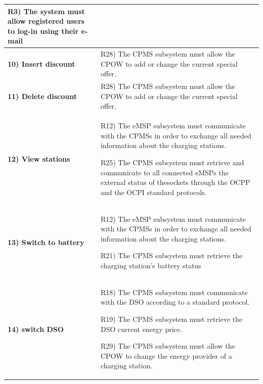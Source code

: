 \documentclass[table, 12pt]{article} %
\begin{document}
\begin{itemize}
\begin{longtable}{|p{}|p{}|}
                    R3) The system must allow registered users to log-in using their e-mail
                    \\\hline

                    \cellcolor{SpringGreen!50}\textbf{10) Insert discount}\centering & 
                    R28) The CPMS subsystem must allow the CPOW to add or change the current special offer.
                    \\\hline

                    \cellcolor{SpringGreen!50}\textbf{11) Delete discount}\centering & 
                    R28) The CPMS subsystem must allow the CPOW to add or change the current special offer.
                    \\\hline

                    \cellcolor{SpringGreen!50}\textbf{12) View stations}\centering & 
                    R12) The eMSP subsystem must communicate with the CPMSs in order to exchange all needed information about the charging stations.
                    
                    R25) The CPMS subsystem must retrieve and communicate to all connected eMSPs the external status of thesockets through the OCPP and the OCPI standard protocols.\\\hline

                    \cellcolor{SpringGreen!50}\textbf{13) Switch to battery}\centering & 
                    R12) The eMSP subsystem must communicate with the CPMSs in order to exchange all needed information about the charging stations.

                    R21)  The CPMS subsystem must retrieve the charging station's battery status 
                    \\\hline

                    \cellcolor{SpringGreen!50}\textbf{14) switch DSO}\centering & 
                    R18) The CPMS subsystem must communicate with the DSO according to a standard protocol.

                    R19) The CPMS subsystem must retrieve the DSO current energy price.

                    R29) The CPMS subsystem must allow the CPOW to change the energy provider of a charging station.
                    \\\hline
            \end{longtable}
    
    \end{itemize}
\end{document}
